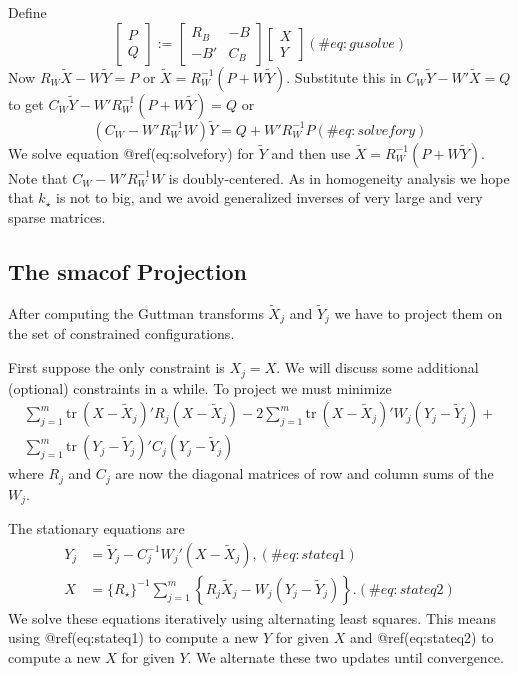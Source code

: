 \documentclass[
  12pt,
  letterpaper,
  DIV=11,
  numbers=noendperiod]{scrartcl}
\begin{document}
Define \begin{equation}
\begin{bmatrix}
P\\Q
\end{bmatrix}:=
\begin{bmatrix}
R_B&-B\\
-B'&C_B
\end{bmatrix}
\begin{bmatrix}X\\Y\end{bmatrix}
(\#eq:gusolve)
\end{equation} Now \(R_W\tilde X-W\tilde Y=P\) or
\(\tilde X=R_W^{-1}(P+W\tilde Y)\). Substitute this in
\(C_W\tilde Y-W'\tilde X=Q\) to get
\(C_W\tilde Y-W'R_W^{-1}(P+W\tilde Y)=Q\) or \begin{equation}
(C_W-W'R_W^{-1}W)\tilde Y=Q+W'R_W^{-1}P
(\#eq:solvefory)
\end{equation} We solve equation @ref(eq:solvefory) for \(\tilde Y\) and
then use \(\tilde X=R_W^{-1}(P+W\tilde Y)\). Note that
\(C_W-W'R_W^{-1}W\) is doubly-centered. As in homogeneity analysis we
hope that \(k_\star\) is not to big, and we avoid generalized inverses
of very large and very sparse matrices.

\subsection{The smacof Projection}\label{the-smacof-projection}

After computing the Guttman transforms \(\tilde X_j\) and \(\tilde Y_j\)
we have to project them on the set of constrained configurations.

First suppose the only constraint is \(X_j=X\). We will discuss some
additional (optional) constraints in a while. To project we must
minimize \begin{multline}
\sum_{j=1}^m\text{tr}\ (X-\tilde X_j)'R_j(X-\tilde X_j)-2\sum_{j=1}^m\text{tr}\ (X-\tilde X_j)'W_j(Y_j-\tilde Y_j)+\\
\sum_{j=1}^m\text{tr}\ (Y_j-\tilde Y_j)'C_j(Y_j-\tilde Y_j)
\end{multline} where \(R_j\) and \(C_j\) are now the diagonal matrices
of row and column sums of the \(W_j\).

The stationary equations are \begin{align}
Y_j&=\tilde Y_j-C_j^{-1}W_j'(X-\tilde X_j),(\#eq:stateq1)\\
X&=\{R_\star\}^{-1}\sum_{j=1}^m\left\{R_j\tilde X_j-W_j(Y_j-\tilde Y_j)\right\}.(\#eq:stateq2)
\end{align} We solve these equations iteratively using alternating least
squares. This means using @ref(eq:stateq1) to compute a new \(Y\) for
given \(X\) and @ref(eq:stateq2) to compute a new \(X\) for given \(Y\).
We alternate these two updates until convergence.
\end{document}
